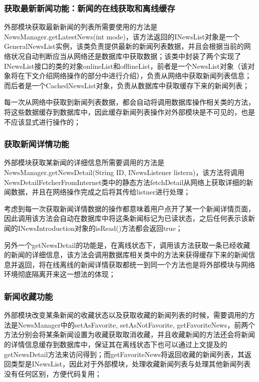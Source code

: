 \documentclass[UTF8]{ctexart}
\begin{document}
	\subsubsection{获取最新新闻功能：新闻的在线获取和离线缓存}
		外部模块获取最新新闻的列表所需要使用的方法是NewsManager.getLatestNews(int mode)，该方法返回的INewsList对象是一个GeneralNewsList实例，该类负责提供最新的新闻列表数据，并且会根据当前的网络状况自动判断应当从网络还是数据库中获取数据；该类中封装了两个实现了INewsList接口的类的对象onlineList和offlineList，前者是一个NewsList对象（该对象将在下文介绍网络操作的部分中进行介绍），负责从网络中获取新闻列表信息；而后者是一个CachedNewsList对象，负责从数据库中获取缓存下来的新闻列表；

		每一次从网络中获取到新闻列表数据，都会自动将调用数据库操作相关类的方法，将这些数据缓存到数据库中，因此缓存新闻列表操作对外部模块是不可见的，也是不应该显式进行操作的；

	\subsubsection{获取新闻详情功能}
		外部模块获取某新闻的详细信息所需要调用的方法是NewsManager.getNewsDetail(String ID, INewsListener listern)，该方法将调用NewsDetailFetcherFromInternet类中的静态方法fetchDetail从网络上获取详细的新闻数据，并且在网络操作完成之后将其传给listner进行处理；

		考虑到每一次获取新闻详情数据的操作都意味着用户点开了某一个新闻详情页面，因此调用该方法会自动在数据库中将这条新闻标记为已读状态，之后任何表示该新闻的INewsIntroduction对象的isRead()方法都会返回true；

		另外一个getNewsDetail的功能是，在离线状态下，调用该方法获取一条已经收藏的新闻的详细信息，该方法会调用数据库相关类中的方法来获得缓存下来的新闻信息并返回，将在线离线的新闻详情获取都统一到同一个方法也是将外部模块与网络环境彻底隔离开来这一想法的体现；

	\subsubsection{新闻收藏功能}
		外部模块改变某条新闻的收藏状态以及获取收藏的新闻列表的时候，需要调用的方法是NewsManager中的setAsFavorite, setAsNotFavorite, getFavoriteNews，前两个方法分别会将某条新闻设置为收藏获取取消收藏，并且收藏新闻的方法还会将新闻的详情信息缓存到数据库中，保证其在离线状态下也可以通过上文提及的getNewsDetail方法来访问得到；而getFavoriteNews将返回收藏的新闻列表，其返回类型是INewsList，因此对于外部模块，处理收藏新闻列表与处理其他新闻列表没有任何区别，方便代码复用；
\end{document}
